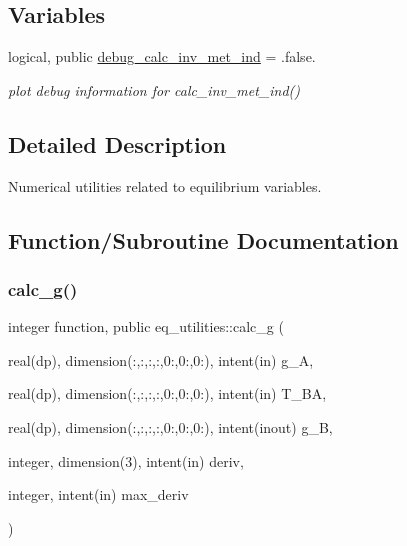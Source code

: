 \subsection*{Variables}
\begin{DoxyCompactItemize}
\item 
logical, public \hyperlink{namespaceeq__utilities_aedf0e1858d0bd16218a290f4857d416a}{debug\+\_\+calc\+\_\+inv\+\_\+met\+\_\+ind} = .false.
\begin{DoxyCompactList}\small\item\em plot debug information for calc\+\_\+inv\+\_\+met\+\_\+ind() \end{DoxyCompactList}\end{DoxyCompactItemize}


\subsection{Detailed Description}
Numerical utilities related to equilibrium variables. 

\subsection{Function/\+Subroutine Documentation}
\mbox{\label{namespaceeq__utilities_a1426f7226577f8719472265fd882fbf4}} 
\subsubsection{\texorpdfstring{calc\+\_\+g()}{calc\_g()}}
{\footnotesize\ttfamily integer function, public eq\+\_\+utilities\+::calc\+\_\+g (\begin{DoxyParamCaption}\item[{real(dp), dimension(\+:,\+:,\+:,\+:,0\+:,0\+:,0\+:), intent(in)}]{g\+\_\+A,  }\item[{real(dp), dimension(\+:,\+:,\+:,\+:,0\+:,0\+:,0\+:), intent(in)}]{T\+\_\+\+BA,  }\item[{real(dp), dimension(\+:,\+:,\+:,\+:,0\+:,0\+:,0\+:), intent(inout)}]{g\+\_\+B,  }\item[{integer, dimension(3), intent(in)}]{deriv,  }\item[{integer, intent(in)}]{max\+\_\+deriv }\end{DoxyParamCaption})}



